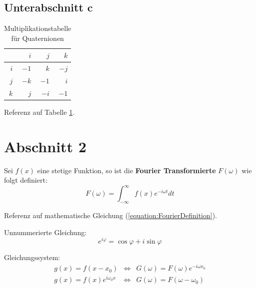 \subsection{Unterabschnitt c}

\begin{table}[h]
	\centering
	\begin{tabular}{r|rrr}
		    & $i$ & $j$ & $k$ \\ \hline
		$i$ &$-1$ & $k$ &$-j$ \\
		$j$ &$-k$ &$-1$ & $i$ \\
		$k$ & $j$ &$-i$ &$-1$
	\end{tabular}
	\caption{
		Multiplikationstabelle für Quaternionen
	}
	\label{table:Quaternions}
\end{table}

Referenz auf Tabelle \ref{table:Quaternions}.

\section{Abschnitt 2}
\label{section:MathematicalStuff}

Sei $f(x)$ eine stetige Funktion, so ist die \textbf{Fourier Transformierte}
$F(\omega)$ wie folgt definiert:
\begin{equation}
\label{equation:FourierDefinition}
	F(\omega) = \int_{-\infty}^{\infty} f(x) e^{-i\omega t} dt
\end{equation}

Referenz auf mathematische Gleichung (\ref{equation:FourierDefinition}).

Unnummerierte Gleichung:
\begin{equation*}
	e^{i\varphi} = \cos\varphi + i \sin\varphi
\end{equation*}

Gleichungssystem:
\begin{eqnarray}
	g(x) = f(x - x_0) & \Leftrightarrow &
		G(\omega) = F(\omega) e^{-i\omega x_0} \\
	g(x) = f(x) e^{i\omega_0 x} & \Leftrightarrow &
		G(\omega) = F(\omega - \omega_0)
\end{eqnarray}

